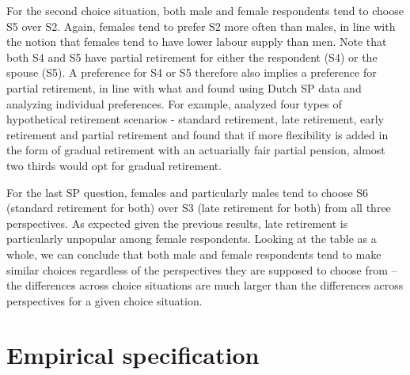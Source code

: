 \documentclass[11pt,letter]{article}
\begin{document}
For the second choice situation, both male and female respondents tend to choose S5 over S2. Again, females tend to prefer S2 more often than males, in line with the notion that females tend to have lower labour supply than men. Note that both S4 and S5 have partial retirement for either the respondent (S4) or the spouse (S5). A preference for S4 or S5 therefore also implies a preference for partial retirement, in line with what \citet{vsoest2014} and \cite{Elsayed2018} found using Dutch SP data and analyzing individual preferences. For example, \citet{vsoest2014} analyzed four types of hypothetical retirement scenarios - standard retirement, late retirement, early retirement and partial retirement and found that if more flexibility is added in the form of gradual retirement with an actuarially fair partial pension, almost two thirds would opt for gradual retirement.

For the last SP question, females and particularly males tend to choose S6 (standard retirement for both) over S3 (late retirement for both) from all three perspectives. As expected given the previous results, late retirement is particularly unpopular among female respondents. Looking at the table as a whole, we can conclude that both male and female respondents tend to make similar choices regardless of the perspectives they are supposed to choose from -- the differences across choice situations are much larger than the differences across perspectives for a given choice situation.

\section{Empirical specification}
\end{document}
